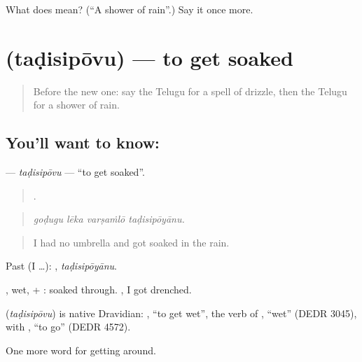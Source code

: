 \begin{tcolorbox}[breakable,colback=teal!4,colframe=teal!35!black,title={Before you move on}]
What does  mean? (\textquotedblleft{}A shower of rain\textquotedblright{}.) Say it once more.
\end{tcolorbox}
\section[\texorpdfstring{\te{తడిసిపోవు} (taḍisipōvu)}{తడిసిపోవు (taḍisipōvu)}]{ (taḍisipōvu) — to get soaked}

\label{lesson:TE-C477-tadisipovu}



\begin{quote}
Before the new one: say the Telugu for a spell of drizzle, then the Telugu for a shower of rain.
\end{quote}

\subsection*{You'll want to know: }
\textbf{} — \emph{taḍisipōvu} — \textquotedblleft{}to get soaked\textquotedblright{}.

\begin{quote}
   .
\end{quote}

\begin{quote}
\emph{goḍugu lēka varṣaṁlō taḍisipōyānu.}
\end{quote}

\begin{quote}
I had no umbrella and got soaked in the rain.
\end{quote}

Past (I …): , \emph{taḍisipōyānu}.

, wet, + : soaked through.  , I got drenched.

\begin{cousinweb}
\textbf{} (\emph{taḍisipōvu}) is native Dravidian: , \textquotedblleft{}to get wet\textquotedblright{}, the verb of , \textquotedblleft{}wet\textquotedblright{} (DEDR 3045), with , \textquotedblleft{}to go\textquotedblright{} (DEDR 4572).
\end{cousinweb}

\begin{grammarlens}[title={What you've built}]
One more word for getting around.
\end{grammarlens}

